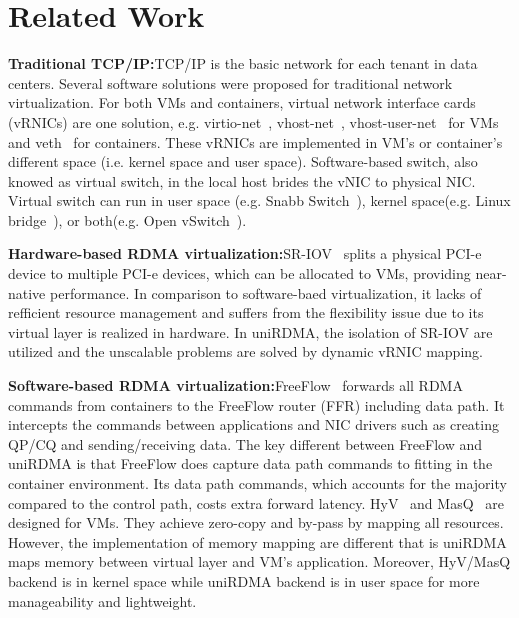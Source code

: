 \section{Related Work} \label{relatedwork}

\textbf{Traditional TCP/IP:}\quad TCP/IP is the basic network for each tenant in data centers. Several software solutions were proposed for traditional network virtualization. For both VMs and containers, virtual network interface cards (vRNICs) are one solution, e.g. virtio-net~\cite{virtio-russell2008}, vhost-net~\cite{vhost-net},  vhost-user-net~\cite{vhost-user-net} for VMs and veth~\cite{veth} for containers. These vRNICs are implemented in VM's or container's different space (i.e. kernel space and user space). Software-based switch, also knowed as virtual switch, in the local host brides the vNIC to physical NIC. Virtual switch can run in user space (e.g. Snabb Switch~\cite{snabb}), kernel space(e.g. Linux bridge~\cite{linux-bridge}), or both(e.g. Open vSwitch~\cite{ovs-2015}). 

\textbf{Hardware-based RDMA virtualization:}\quad SR-IOV~\cite{sr-iov} splits a physical PCI-e device to multiple PCI-e devices, which can be allocated to VMs, providing near-native performance. In comparison to software-baed virtualization, it lacks of refficient resource management and suffers from the flexibility issue due to its virtual layer is realized in hardware. In uniRDMA, the isolation of SR-IOV are utilized and the unscalable problems are solved by dynamic vRNIC mapping. 

\textbf{Software-based RDMA virtualization:}\quad FreeFlow~\cite{kim2019freeflow} forwards all RDMA commands from containers to the FreeFlow router (FFR) including data path. It intercepts the commands between applications and NIC drivers such as creating QP/CQ and sending/receiving data. The key different between FreeFlow and uniRDMA is that FreeFlow does capture data path commands to fitting in the container environment. Its data path commands, which accounts for the majority compared to the control path, costs extra forward latency. HyV~\cite{pfefferle2015hybrid} and MasQ~\cite{he2020masq} are designed for VMs. They achieve zero-copy and by-pass by mapping all resources. However, the implementation of memory mapping are different that is uniRDMA maps memory between virtual layer and VM's application. Moreover, HyV/MasQ backend is in kernel space while uniRDMA backend is in user space for more manageability and lightweight.